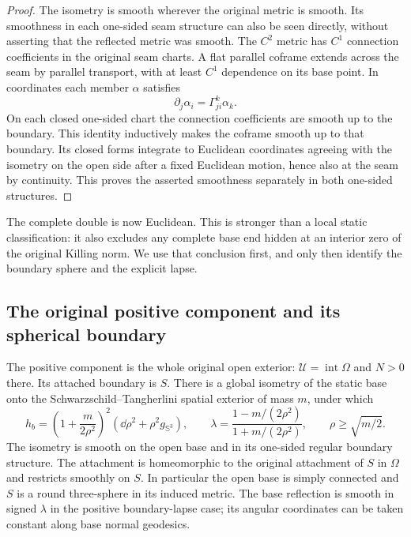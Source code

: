 \begin{proof}
The isometry is smooth wherever the original metric is smooth.
Its smoothness in each one-sided seam structure can also be seen
directly, without asserting that the reflected metric was smooth.
The $C^2$ metric has $C^1$ connection coefficients in the original
seam charts.  A flat parallel coframe extends across the seam by
parallel transport, with at least $C^1$ dependence on its base point.
In coordinates each member $\alpha$ satisfies
\[
 \partial_j\alpha_i=\Gamma^k_{ji}\alpha_k.
\]
On each closed one-sided chart the connection coefficients are smooth
up to the boundary.  This identity inductively makes the coframe
smooth up to that boundary.  Its closed forms integrate to Euclidean
coordinates agreeing with the isometry on the open side after a fixed
Euclidean motion, hence also at the seam by continuity.  This proves
the asserted smoothness separately in both one-sided structures.
\end{proof}

The complete double is now Euclidean. This is stronger than a local
static classification: it also excludes any complete base end hidden at
an interior zero of the original Killing norm. We use that conclusion
first, and only then identify the boundary sphere and the explicit lapse.

\subsection{The original positive component and its spherical boundary}

\begin{proposition}
\label{q4:cla:static-classification}
The positive component is the whole original open exterior:
$\mathcal U=\operatorname{int}\Omega$ and $N>0$ there.
Its attached boundary is $S$.  There is a global isometry of the
static base onto the Schwarzschild--Tangherlini spatial exterior of
mass $m$, under which
\begin{equation}\label{q4:cla:ST-base}
 h_b=\left(1+\frac{m}{2\rho^2}\right)^2
          (\dd\rho^2+\rho^2 g_{\mathbb S^3}),\qquad
 \lambda=\frac{1-m/(2\rho^2)}{1+m/(2\rho^2)},
 \qquad \rho\ge\sqrt{m/2}.
\end{equation}
The isometry is smooth on the open base and in its one-sided regular
boundary structure.  The attachment is homeomorphic to the original
attachment of $S$ in $\Omega$ and restricts smoothly on $S$.
In particular the open base is simply connected and $S$ is a round
three-sphere in its induced metric.  The base reflection is smooth
in signed $\lambda$ in the positive boundary-lapse case; its angular
coordinates can be taken constant along base normal geodesics.
\end{proposition}

